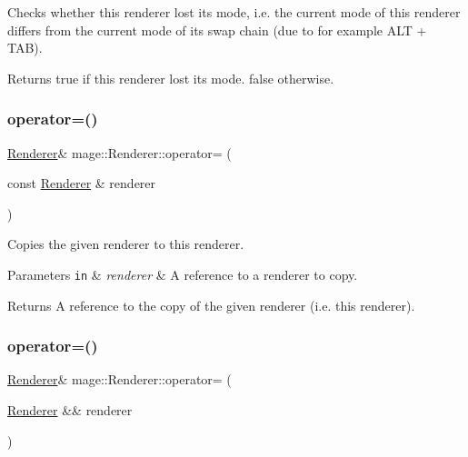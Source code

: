 Checks whether this renderer lost its mode, i.\+e. the current mode of this renderer differs from the current mode of its swap chain (due to for example A\+LT + T\+AB).

\begin{DoxyReturn}{Returns}
{\ttfamily true} if this renderer lost its mode. {\ttfamily false} otherwise. 
\end{DoxyReturn}
\hypertarget{classmage_1_1_renderer_a2762ead5f771ae95e4293cd7eb1a2834}{}\label{classmage_1_1_renderer_a2762ead5f771ae95e4293cd7eb1a2834} 
\subsubsection{\texorpdfstring{operator=()}{operator=()}\hspace{0.1cm}{\footnotesize\ttfamily [1/2]}}
{\footnotesize\ttfamily \hyperlink{classmage_1_1_renderer}{Renderer}\& mage\+::\+Renderer\+::operator= (\begin{DoxyParamCaption}\item[{const \hyperlink{classmage_1_1_renderer}{Renderer} \&}]{renderer }\end{DoxyParamCaption})\hspace{0.3cm}{\ttfamily [delete]}}

Copies the given renderer to this renderer.


\begin{DoxyParams}[1]{Parameters}
\mbox{\tt in}  & {\em renderer} & A reference to a renderer to copy. \\
\hline
\end{DoxyParams}
\begin{DoxyReturn}{Returns}
A reference to the copy of the given renderer (i.\+e. this renderer). 
\end{DoxyReturn}
\hypertarget{classmage_1_1_renderer_aa381bb89bffdc8ea2d8e3625e28cd28a}{}\label{classmage_1_1_renderer_aa381bb89bffdc8ea2d8e3625e28cd28a} 
\subsubsection{\texorpdfstring{operator=()}{operator=()}\hspace{0.1cm}{\footnotesize\ttfamily [2/2]}}
{\footnotesize\ttfamily \hyperlink{classmage_1_1_renderer}{Renderer}\& mage\+::\+Renderer\+::operator= (\begin{DoxyParamCaption}\item[{\hyperlink{classmage_1_1_renderer}{Renderer} \&\&}]{renderer }\end{DoxyParamCaption})\hspace{0.3cm}{\ttfamily [delete]}}

